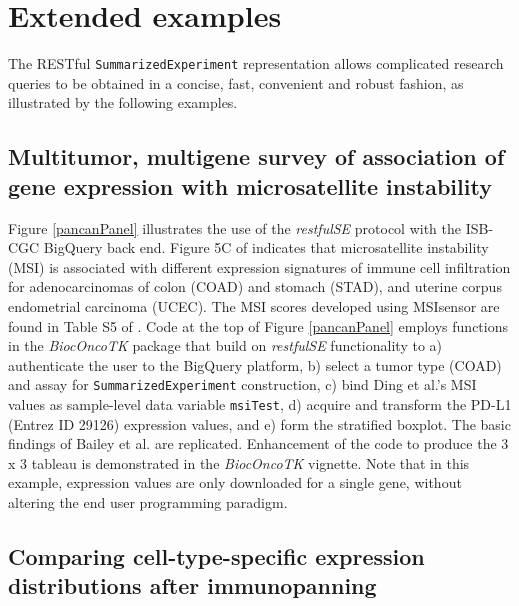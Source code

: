 \documentclass[applications]{gen-bioinformatics}
\newcommand{\Biocpackage}[1]{{\textit{#1}}}
\newcommand{\BiocpackageFirst}[1]{{\textit{#1}}}
\begin{document}
\section*{Extended examples}

The RESTful \texttt{SummarizedExperiment} representation
allows complicated research queries to be obtained in a concise,
fast, convenient and robust fashion, as illustrated by
the following examples.


\subsection*{Multitumor, multigene survey of association
of gene expression with microsatellite instability}

Figure \ref{pancanPanel} illustrates the 
use of the \Biocpackage{restfulSE} protocol
with the ISB-CGC BigQuery back end.  Figure 5C
of \citet{Bailey2018} indicates that
microsatellite instability (MSI) is associated with
different expression signatures of immune cell infiltration
for adenocarcinomas of colon (COAD) and stomach (STAD), and
uterine corpus endometrial carcinoma (UCEC).  
The MSI scores developed using MSIsensor are found
in Table S5 of \cite{Ding2018}.
Code at the top of Figure \ref{pancanPanel} employs
functions in the \BiocpackageFirst{BiocOncoTK} \citep{bionc} package that build on
\Biocpackage{restfulSE} functionality to a) authenticate the
user to the BigQuery platform, b) select a tumor
type (COAD) and assay for \texttt{SummarizedExperiment}
construction, c) bind Ding et al.'s MSI values as
sample-level data variable \verb+msiTest+, d)
acquire and transform the PD-L1 
(Entrez ID 29126)
expression values, and e) form the stratified boxplot. 
The basic findings of Bailey et al. are replicated.
Enhancement of the code to produce the 3 x 3 tableau
is demonstrated in the \Biocpackage{BiocOncoTK} \citep{bionc} vignette.
Note that in this example, expression values are
only downloaded for a single gene, without altering
the end user programming paradigm.



\subsection*{Comparing cell-type-specific 
expression distributions after immunopanning}
\end{document}
